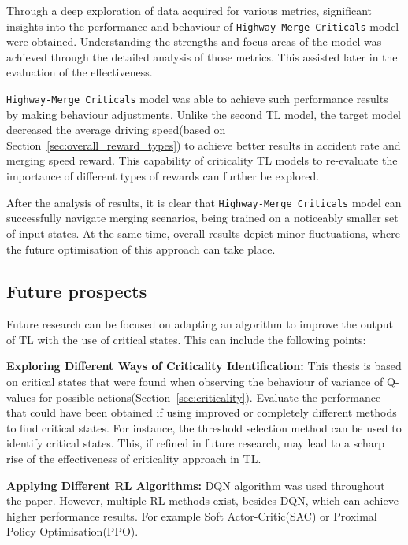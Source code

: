 Through a deep exploration of data acquired for various metrics, significant insights into the performance and behaviour of \texttt{Highway-Merge Criticals} model were obtained. Understanding the strengths and focus areas of the model was achieved through the detailed analysis of those metrics. This assisted later in the evaluation of the effectiveness.

\texttt{Highway-Merge Criticals} model was able to achieve such performance results by making behaviour adjustments. Unlike the second TL model, the target model decreased the average driving speed(based on Section~\ref{sec:overall_reward_types}) to achieve better results in accident rate and merging speed reward. This capability of criticality TL models to re-evaluate the importance of different types of rewards can further be explored.

After the analysis of results, it is clear that \texttt{Highway-Merge Criticals} model can successfully navigate merging scenarios, being trained on a noticeably smaller set of input states. At the same time, overall results depict minor fluctuations, where the future optimisation of this approach can take place.

\subsection{Future prospects}\label{sec:subsec_5.2}

Future research can be focused on adapting an algorithm to improve the output of TL with the use of critical states. This can include the following points:

\textbf{Exploring Different Ways of Criticality Identification:} This thesis is based on critical states that were found when observing the behaviour of variance of Q-values for possible actions(Section~\ref{sec:criticality}). Evaluate the performance that could have been obtained if using improved or completely different methods to find critical states. For instance, the threshold selection method can be used to identify critical states. This, if refined in future research, may lead to a scharp rise of the effectiveness of criticality approach in TL.

\textbf{Applying Different RL Algorithms:} DQN algorithm was used throughout the paper. However, multiple RL methods exist, besides DQN, which can achieve higher performance results. For example Soft Actor-Critic(SAC) or Proximal Policy Optimisation(PPO).

